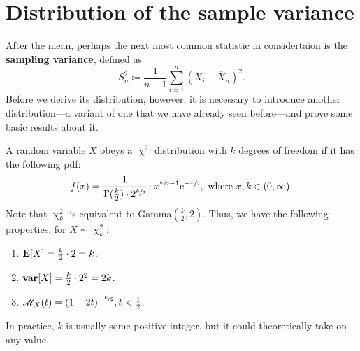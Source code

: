 
\section{Distribution of the sample variance} 
After the mean, perhaps the next most common statistic in considertaion is the \textbf{sampling variance}, defined as\[
    S_n^2 \coloneq \frac{1}{n-1} \sum_{i=1}^n {(X_i - \overline{X}_n)}^2.
\]Before we derive its distribution, however, it is necessary to introduce another distribution---a variant of one that we have already seen before---and prove some basic results about it. 

A random variable \(X\) obeys a \(\upchi^2\) distribution with \(k\) degrees of freedom  if it has the following pdf:\[
    f(x) = \frac{1}{\Gamma (\frac{k}{2}) \cdot 2^{\sfrac{k}{2}}} \cdot x^{\sfrac{k}{2} -1} \mathrm{e}^{-\sfrac{x}{2}},~\text{where}~x,k\in (0,\infty).  
\]Note that \(\upchi_k^2\) is equivalent to \(\mathrm{Gamma}(\frac{k}{2},2)\). 
Thus, we have the following properties, for \(X\sim \upchi_k^2\):\begin{enumerate}
    \item \(\mathbf{E}[X] = \frac{k}{2} \cdot 2 = k\). 
    \item \(\mathbf{var}[X] = \frac{k}{2} \cdot 2^2 = 2k\). 
    \item \(\mathscr{M}_X (t) = {(1-2t)}^{-\sfrac{k}{2}}, t<\frac{1}{2}\). 
\end{enumerate}
In practice, \(k\) is usually some positive integer, but it could theoretically take on any value. 

